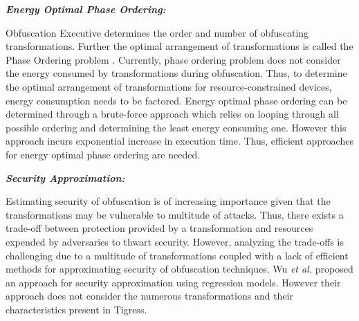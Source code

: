 \emph{\textbf{Energy Optimal Phase Ordering:}}

Obfuscation Executive \cite{heffner} determines the order and number of obfuscating transformations. Further the optimal arrangement of transformations is called the Phase Ordering problem \cite{holder}. Currently, phase ordering problem does not consider the energy consumed by transformations during obfuscation. Thus, to determine the optimal arrangement of transformations for resource-constrained devices, energy consumption needs to be factored. Energy optimal phase ordering can be determined through a brute-force approach which relies on looping through all possible ordering and determining the least energy consuming one. However this approach incurs exponential increase in execution time. Thus, efficient approaches for energy optimal phase ordering are needed.       

\emph{\textbf{Security Approximation:}}

Estimating security of obfuscation is of increasing importance given that the transformations may be vulnerable to multitude of attacks. Thus, there exists a trade-off between protection provided by a transformation and resources expended by adversaries to thwart security. However, analyzing the trade-offs is challenging due to a multitude of transformations coupled with a lack of efficient methods for approximating security of obfuscation techniques. Wu \textit{et al.} \cite{wu2010framework} proposed an approach for security approximation using regression models. However their approach does not consider the numerous transformations and their characteristics present in Tigress. 


